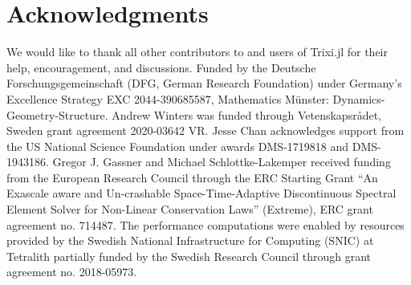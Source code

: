 \documentclass[hidelinks]{juliacon} %
\newcommand{\trixi}{Trixi.jl\xspace}
\begin{document}
\section*{Acknowledgments}

We would like to thank all other contributors to and users of \trixi for their
help, encouragement, and discussions.
Funded by the Deutsche Forschungsgemeinschaft (DFG, German Research Foundation)
under Germany's Excellence Strategy EXC 2044-390685587, Mathematics Münster:
Dynamics-Geometry-Structure.
Andrew Winters was funded through Vetenskapsr{\aa}det, Sweden grant
agreement 2020-03642 VR.
Jesse Chan acknowledges support from the US National Science Foundation under
awards DMS-1719818 and DMS-1943186.
Gregor J. Gassner and Michael Schlottke-Lakemper received funding from the European Research Council through the ERC Starting Grant “An Exascale aware and Un-crashable Space-Time-Adaptive Discontinuous Spectral Element Solver for Non-Linear Conservation Laws” (Extreme), ERC grant agreement no. 714487.
The performance computations were enabled by resources provided by the Swedish National
Infrastructure for Computing (SNIC) at Tetralith partially funded by the Swedish
Research Council through grant agreement no. 2018-05973.



\end{document}
